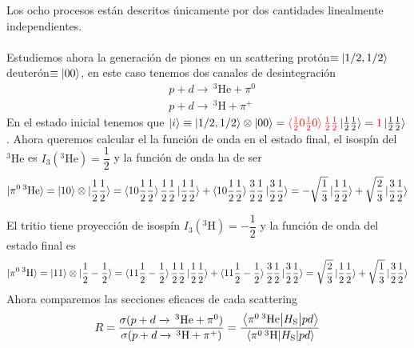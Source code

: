 \noindent
Los ocho procesos están descritos únicamente por dos cantidades linealmente independientes. 
\\\\
Estudiemos ahora la generación de piones en un scattering protón$\equiv \ket{1/2,1/2}$ deuterón$\equiv \ket{00}$, en este caso tenemos dos canales de desintegración
\begin{equation*}
    \begin{aligned}
        &p+d\longrightarrow \,^3\text{He}+\pi^0 \\
        &p+d\longrightarrow \,^3\text{H}+\pi^+
    \end{aligned}
\end{equation*}
En el estado inicial tenemos que $\ket{i}\equiv \ket{1/2,1/2}\otimes \ket{00}=\textcolor{red}{\braket{\frac{1}{2}0\frac{1}{2}0}{\frac{1}{2}\frac{1}{2}}}\ket{\frac{1}{2}\frac{1}{2}}=\textcolor{red}{1}\ket{\frac{1}{2}\frac{1}{2}}$. Ahora queremos calcular el la función de onda en el estado final, el isospín del $^3\text{He}$ es $I_3(^3\text{He})=\dfrac{1}{2}$ y la función de onda ha de ser
\begin{equation*}
\ket{\pi^0\, ^3\text{He}}=\ket{10}\otimes\ket{\frac{1}{2} \frac{1}{2}}=\braket{10\frac{1}{2} \frac{1}{2}}{\frac{1}{2}\frac{1}{2}}\ket{\frac{1}{2}\frac{1}{2}}+\braket{10\frac{1}{2} \frac{1}{2}}{\frac{3}{2}\frac{1}{2}}\ket{\frac{3}{2}\frac{1}{2}}=-\sqrt{\frac{1}{3}} \ket{\frac{1}{2}\frac{1}{2}}+\sqrt{\frac{2}{3}}\ket{\frac{3}{2}\frac{1}{2}}
\end{equation*}

\noindent El tritio tiene proyección de isospín  $I_3(^3\text{H})=-\dfrac{1}{2}$ y la función de onda del estado final es 
\begin{equation*}
    \ket{\pi^0\, ^3\text{H}}=\ket{11}\otimes\ket{\frac{1}{2} -\frac{1}{2}}=\braket{11\frac{1}{2} -\frac{1}{2}}{\frac{1}{2}\frac{1}{2}}\ket{\frac{1}{2}\frac{1}{2}}+\braket{11\frac{1}{2} -\frac{1}{2}}{\frac{3}{2}\frac{1}{2}}\ket{\frac{3}{2}\frac{1}{2}}=\sqrt{\frac{2}{3}} \ket{\frac{1}{2}\frac{1}{2}}+\sqrt{\frac{1}{3}}\ket{\frac{3}{2}\frac{1}{2}}
\end{equation*}
Ahora comparemos las secciones eficaces de cada scattering
\begin{equation*}
    R=\frac{\sigma(p+d\xrightarrow{} \,^3\text{He}+\pi^0 )}{\sigma (p+d\xrightarrow[]{} \,^3\text{H}+\pi^+)}= \frac{\mel{\pi^0\, ^3\text{He}}{H_\mathrm{S}}{pd}}{\mel{\pi^0\, ^3\text{H}}{H_\mathrm{S}}{pd}}
\end{equation*}

